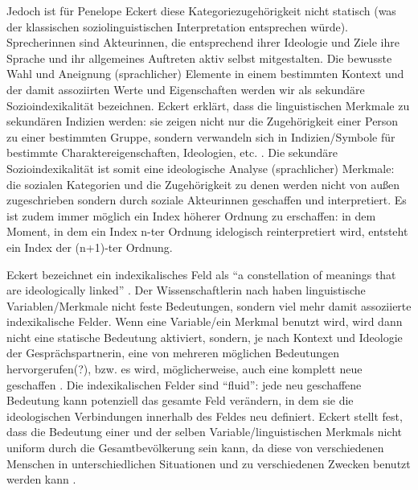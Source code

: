 Jedoch ist für Penelope Eckert diese Kategoriezugehörigkeit nicht statisch (was der klassischen soziolinguistischen Interpretation entsprechen würde).%
Sprecherinnen sind Akteurinnen, die entsprechend ihrer Ideologie und Ziele ihre Sprache und ihr allgemeines Auftreten aktiv selbst mitgestalten.
Die bewusste Wahl und Aneignung (sprachlicher) Elemente in einem bestimmten Kontext und der damit assoziirten Werte und Eigenschaften werden wir als sekundäre Sozioindexikalität bezeichnen.
Eckert erklärt, dass die linguistischen Merkmale zu sekundären Indizien werden: sie zeigen nicht nur die Zugehörigkeit einer Person zu einer bestimmten Gruppe, sondern verwandeln sich in Indizien/Symbole für bestimmte Charaktereigenschaften, Ideologien, etc. \cite[vgl.][]{Eckert08}.
Die sekundäre Sozioindexikalität ist somit eine ideologische Analyse (sprachlicher) Merkmale: die sozialen Kategorien und die Zugehörigkeit zu denen werden nicht von außen zugeschrieben sondern durch soziale Akteurinnen geschaffen und interpretiert.
Es ist zudem immer möglich ein Index höherer Ordnung zu erschaffen: in dem Moment, in dem ein Index n-ter Ordnung idelogisch reinterpretiert wird, entsteht ein Index der (n+1)-ter Ordnung.


Eckert bezeichnet ein indexikalisches Feld als ``a constellation of meanings that are ideologically linked'' \cite[vgl.][]{Eckert08}.
Der Wissenschaftlerin nach haben linguistische Variablen/Merkmale nicht feste Bedeutungen, sondern viel mehr damit assoziierte indexikalische Felder.
Wenn eine Variable/ein Merkmal benutzt wird, wird dann nicht eine statische Bedeutung aktiviert, sondern, je nach Kontext und Ideologie der Gesprächspartnerin, eine von mehreren möglichen Bedeutungen hervorgerufen(?), bzw. es wird, möglicherweise, auch eine komplett neue geschaffen \cite[vgl.][]{Eckert08}.
Die indexikalischen Felder sind ``fluid'': jede neu geschaffene Bedeutung kann potenziell das gesamte Feld verändern, in dem sie die ideologischen Verbindungen innerhalb des Feldes neu definiert. %
Eckert stellt fest, dass die Bedeutung einer und der selben Variable/linguistischen Merkmals nicht uniform durch die Gesamtbevölkerung sein kann, da diese von verschiedenen Menschen in unterschiedlichen Situationen und zu verschiedenen Zwecken benutzt werden kann \cite[vgl.][]{Eckert08}.

